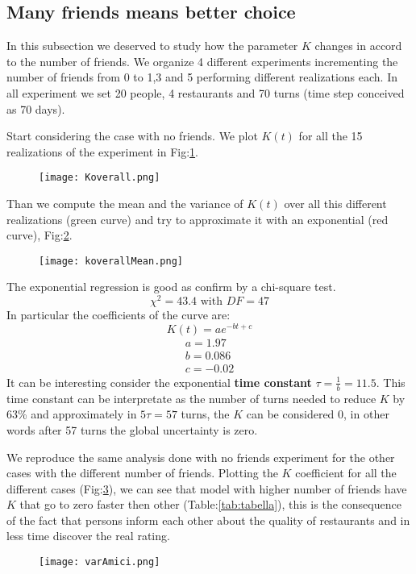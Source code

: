 \documentclass[12pt]{book}
\begin{document}
\subsection{Many friends means better choice}
In this subsection we deserved to study how the parameter $K$ changes in accord to the number of friends. We organize 4 different experiments incrementing the number of friends from 0 to 1,3 and 5 performing different realizations each.
In all experiment we set 20 people, 4 restaurants and 70 turns (time step conceived as 70 days).

Start considering the case with no friends. We plot $K(t)$ for all the 15 realizations of the experiment in  Fig:\ref{fig:15re}.
\begin{figure}[hbt]
  \centering
  \texttt{[image: Koverall.png]}
  \caption{}
  \label{fig:15re}
\end{figure}
Than we compute the mean and the variance of $K(t)$ over all this different realizations (green curve) and try to approximate it with an exponential (red curve), Fig:\ref{fig:aprox}.
\begin{figure}[hbt]
  \centering
  \texttt{[image: koverallMean.png]}
  \label{fig:aprox}
  \caption{}
\end{figure} 
The exponential regression is good as confirm by a chi-square test.\\
$${\chi ^2} = 43.4 \text{ with } DF = 47$$
In particular the coefficients of the curve are:
\[K\left( t \right) = a{e^{ - bt + c}}\] 
\[\begin{array}{l}
a = 1.97\\
b = 0.086\\
c =  - 0.02
\end{array}\]
It can be interesting consider the exponential \textbf{time constant} $\tau  = \frac{1}{b} = 11.5$. This time constant can be interpretate as the number of turns needed to reduce $K$ by 63\% and approximately in $5 \tau = 57$ turns, the $K$ can be considered $0$, in other words after 57 turns the global uncertainty is zero.


We reproduce the same analysis done with no friends experiment for the other cases with the different number of friends.
Plotting the $K$ coefficient for all the different cases (Fig:\ref{fig:4curves}), we can see that model with higher number of friends have $K$ that go to zero faster then other (Table:\ref{tab:tabella}), this is the consequence of the fact that persons inform each other about the quality of restaurants and in less time discover the real rating.
\begin{figure}[b]
  \centering
  \texttt{[image: varAmici.png]}
  \caption{}
  \label{fig:4curves}
\end{figure}
\end{document}
